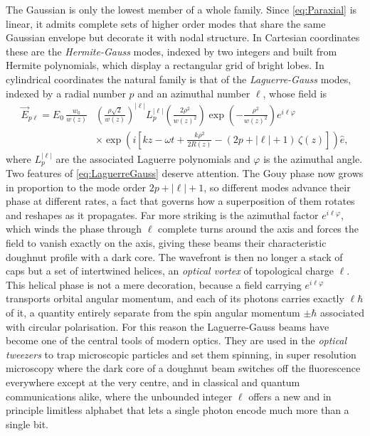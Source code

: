        The Gaussian is only the lowest member of a whole family. Since \ref{eq:Paraxial} is linear, it admits complete sets of higher order modes that share the same Gaussian envelope but decorate it with nodal structure. In Cartesian coordinates these are the \textit{Hermite-Gauss} modes, indexed by two integers and built from Hermite polynomials, which display a rectangular grid of bright lobes. In cylindrical coordinates the natural family is that of the \textit{Laguerre-Gauss} modes, indexed by a radial number $p$ and an azimuthal number $\ell$, whose field is
       \begin{equation}\label{eq:LaguerreGauss}
       \begin{aligned}
            \vec{E}_{p\ell} = E_0\,\frac{w_0}{w(z)}&\left(\frac{\rho\sqrt{2}}{w(z)}\right)^{|\ell|} L_p^{|\ell|}\!\left(\frac{2\rho^2}{w(z)^2}\right)\exp\left(-\frac{\rho^2}{w(z)^2}\right)e^{i\ell\varphi}\\
            &\times\exp\left(i\left[kz-\omega t + \frac{k\rho^2}{2R(z)} - (2p+|\ell|+1)\,\zeta(z)\right]\right)\hat{e},
       \end{aligned}
       \end{equation}
       where $L_p^{|\ell|}$ are the associated Laguerre polynomials and $\varphi$ is the azimuthal angle. Two features of \ref{eq:LaguerreGauss} deserve attention. The Gouy phase now grows in proportion to the mode order $2p+|\ell|+1$, so different modes advance their phase at different rates, a fact that governs how a superposition of them rotates and reshapes as it propagates. Far more striking is the azimuthal factor $e^{i\ell\varphi}$, which winds the phase through $\ell$ complete turns around the axis and forces the field to vanish exactly on the axis, giving these beams their characteristic doughnut profile with a dark core. The wavefront is then no longer a stack of caps but a set of intertwined helices, an \textit{optical vortex} of topological charge $\ell$. This helical phase is not a mere decoration, because a field carrying $e^{i\ell\varphi}$ transports orbital angular momentum, and each of its photons carries exactly $\ell\hbar$ of it, a quantity entirely separate from the spin angular momentum $\pm\hbar$ associated with circular polarisation. For this reason the Laguerre-Gauss beams have become one of the central tools of modern optics. They are used in the \textit{optical tweezers} to trap microscopic particles and set them spinning, in super resolution microscopy where the dark core of a doughnut beam switches off the fluorescence everywhere except at the very centre, and in classical and quantum communications alike, where the unbounded integer $\ell$ offers a new and in principle limitless alphabet that lets a single photon encode much more than a single bit.


